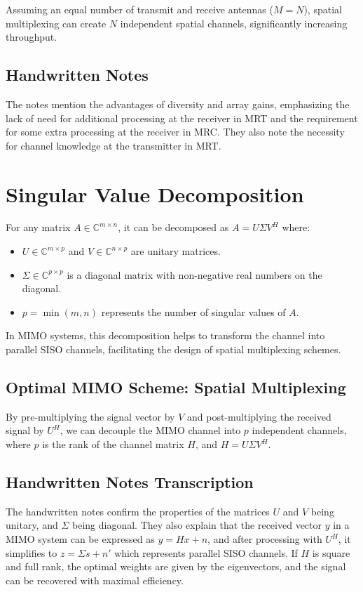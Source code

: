 Assuming an equal number of transmit and receive antennas (\(M = N\)), spatial multiplexing can create \(N\) independent spatial channels, significantly increasing throughput.

\subsection*{Handwritten Notes}
The notes mention the advantages of diversity and array gains, emphasizing the lack of need for additional processing at the receiver in MRT and the requirement for some extra processing at the receiver in MRC. They also note the necessity for channel knowledge at the transmitter in MRT.

\section*{Singular Value Decomposition}

For any matrix \( A \in \mathbb{C}^{m \times n} \), it can be decomposed as \( A = U\Sigma V^H \) where:
\begin{itemize}
    \item \( U \in \mathbb{C}^{m \times p} \) and \( V \in \mathbb{C}^{n \times p} \) are unitary matrices.
    \item \( \Sigma \in \mathbb{C}^{p \times p} \) is a diagonal matrix with non-negative real numbers on the diagonal.
    \item \( p = \min(m,n) \) represents the number of singular values of \( A \).
\end{itemize}

In MIMO systems, this decomposition helps to transform the channel into parallel SISO channels, facilitating the design of spatial multiplexing schemes.

\subsection*{Optimal MIMO Scheme: Spatial Multiplexing}
By pre-multiplying the signal vector by \( V \) and post-multiplying the received signal by \( U^H \), we can decouple the MIMO channel into \( p \) independent channels, where \( p \) is the rank of the channel matrix \( H \), and \( H = U\Sigma V^H \).

\subsection*{Handwritten Notes Transcription}
The handwritten notes confirm the properties of the matrices \( U \) and \( V \) being unitary, and \( \Sigma \) being diagonal. They also explain that the received vector \( y \) in a MIMO system can be expressed as \( y = Hx + n \), and after processing with \( U^H \), it simplifies to \( z = \Sigma s + n' \) which represents parallel SISO channels. If \( H \) is square and full rank, the optimal weights are given by the eigenvectors, and the signal can be recovered with maximal efficiency.
